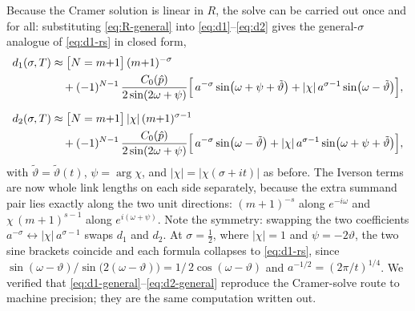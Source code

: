 \documentclass[11pt]{article}
\theoremstyle{definition}
\begin{document}
Because the Cramer solution is linear in $R$, the solve can be carried
out once and for all: substituting \eqref{eq:R-general} into
\eqref{eq:d1}--\eqref{eq:d2} gives the general-$\sigma$ analogue of
\eqref{eq:d1-rs} in closed form,
\begin{align}
d_1(\sigma,T) &\approx
\bigl[N=m{+}1\bigr]\,(m{+}1)^{-\sigma}
\notag\\&\quad
+ (-1)^{N-1}\,\frac{C_0(\hat p)}{2\sin(2\omega+\psi)}
\Bigl[\,a^{-\sigma}\sin\bigl(\omega+\psi+\tilde\vartheta\bigr)
+ |\chi|\,a^{\sigma-1}\sin\bigl(\omega-\tilde\vartheta\bigr)\Bigr],
\label{eq:d1-general}\\[6pt]
d_2(\sigma,T) &\approx
\bigl[N=m{+}1\bigr]\,|\chi|\,(m{+}1)^{\sigma-1}
\notag\\&\quad
+ (-1)^{N-1}\,\frac{C_0(\hat p)}{2\sin(2\omega+\psi)}
\Bigl[\,a^{-\sigma}\sin\bigl(\omega-\tilde\vartheta\bigr)
+ |\chi|\,a^{\sigma-1}\sin\bigl(\omega+\psi+\tilde\vartheta\bigr)\Bigr],
\label{eq:d2-general}
\end{align}
with $\tilde\vartheta=\tilde\vartheta(t)$, $\psi=\arg\chi$, and
$|\chi|=|\chi(\sigma+it)|$ as before. The Iverson terms are now whole
link lengths on each side separately, because the extra summand pair
lies exactly along the two unit directions: $(m{+}1)^{-s}$ along
$e^{-i\omega}$ and $\chi\,(m{+}1)^{s-1}$ along $e^{i(\omega+\psi)}$.
Note the symmetry: swapping the two coefficients
$a^{-\sigma}\leftrightarrow|\chi|\,a^{\sigma-1}$ swaps $d_1$ and $d_2$.
At $\sigma=\tfrac12$, where $|\chi|=1$ and $\psi=-2\vartheta$, the two
sine brackets coincide and each formula collapses to \eqref{eq:d1-rs},
since $\sin(\omega-\vartheta)/\sin\bigl(2(\omega-\vartheta)\bigr)
= 1/\,2\cos(\omega-\vartheta)$ and $a^{-1/2}=(2\pi/t)^{1/4}$. We verified
that \eqref{eq:d1-general}--\eqref{eq:d2-general} reproduce the
Cramer-solve route to machine precision; they are the same
computation written out.
\end{document}
